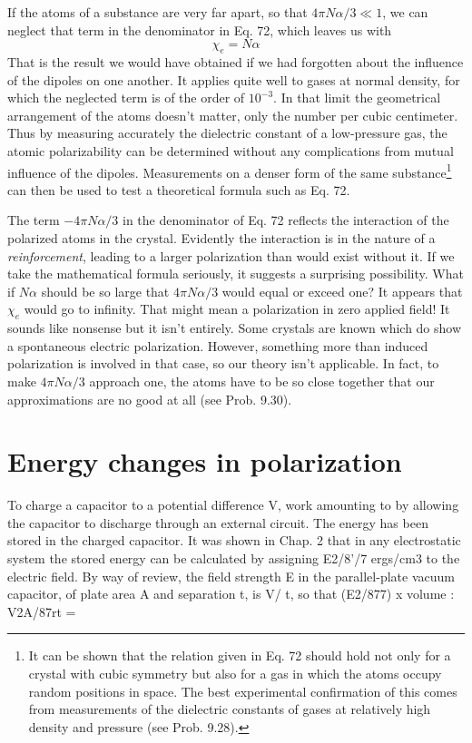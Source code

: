 If the atoms of a substance are very far apart, so that $4\pi N\alpha/3\ll 1$,
we can neglect that term in the denominator in Eq. 72, which leaves
us with
\begin{equation}
  \chi_e = N\alpha
\end{equation}
That is the result we would have obtained if we had forgotten about
the influence of the dipoles on one another. It applies quite well to
gases at normal density, for which the neglected term is of the order
of $10^{-3}$. In that limit the geometrical arrangement of the atoms
doesn't matter, only the number per cubic centimeter. Thus by
measuring accurately the dielectric constant of a low-pressure gas,
the atomic polarizability can be determined without any complications
from mutual influence of the dipoles. Measurements on a
denser form of the same substance\footnote{
It can be shown that the relation given in Eq. 72 should hold not only for a crystal
with cubic symmetry but also for a gas in which the atoms occupy random positions in
space. The best experimental confirmation of this comes from measurements of the
dielectric constants of gases at relatively high density and pressure 
(see Prob. 9.28).} can then be used to test a theoretical formula such as Eq. 72.


The term  $-4\pi N\alpha/3$ in the denominator of Eq. 72 reflects the interaction
of the polarized atoms in the crystal. Evidently the interaction
is in the nature of a \emph{reinforcement}, leading to a larger polarization
than would exist without it. If we take the mathematical formula
seriously, it suggests a surprising possibility. What if $N\alpha$ should be
so large that $4\pi N\alpha/3$ would equal or exceed one? It appears that
$\chi_e$ would go to infinity. That might mean a polarization in zero
applied field! It sounds like nonsense but it isn't entirely. Some
crystals are known which do show a spontaneous electric 
polarization. However, something more than induced polarization is involved
in that case, so our theory isn't applicable. In fact, to make
$4\pi N\alpha/3$ approach one, the atoms have to be so close together that
our approximations are no good at all (see Prob. 9.30).

\iffalse

\section{Energy changes in polarization}

To charge a capacitor to a potential difference V, work amounting
to %
by allowing the capacitor to discharge through an external circuit.
The energy has been stored in the charged capacitor. It was shown
in Chap. 2 that in any electrostatic system the stored energy can be
calculated by assigning E2/8'/7 ergs/cm3 to the electric field. By way
of review, the field strength E in the parallel-plate vacuum capacitor,
of plate area A and separation t, is V/ t, so that (E2/877) x volume :
V2A/87rt = %

